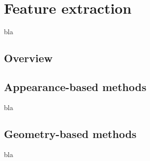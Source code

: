 \chapter{Feature extraction}
\label{chap:extraction}

\noindent bla

\section{Overview}

\section{Appearance-based methods}

\noindent bla
\newline

\section{Geometry-based methods}

\noindent bla
\newline

